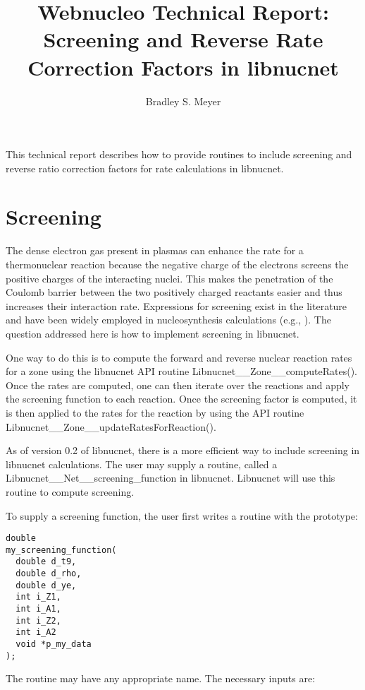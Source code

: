 \documentclass{article}    %
\title{Webnucleo Technical Report: Screening and Reverse Rate Correction
Factors in libnucnet}  %
\author{Bradley S. Meyer}
\begin{document}

\maketitle                 %


This technical report describes how to provide routines to include
screening and reverse ratio correction factors for rate calculations
in libnucnet.

\section{Screening}

The dense electron gas present in plasmas can enhance the rate for a
thermonuclear reaction because the negative charge of the electrons screens
the positive charges of the interacting nuclei.  This makes the penetration
of the Coulomb barrier between the two positively charged reactants easier
and thus increases their interaction rate.
Expressions for screening exist in the literature and have been widely
employed in nucleosynthesis calculations (e.g., \cite{1982ApJ...258..696W}).
The question addressed here is how to implement screening in libnucnet.

One way to do this is to compute the forward and reverse nuclear reaction
rates for a zone using the libnucnet API routine
Libnucnet\_\_Zone\_\_computeRates().
Once the rates are computed, one can
then iterate over the reactions and apply the screening function to each
reaction.  Once the screening factor is computed, it is then applied to
the rates for the reaction by using the API routine
Libnucnet\_\_Zone\_\_updateRatesForReaction().

As of version 0.2 of libnucnet, there is a more efficient way to include
screening in libnucnet calculations.  The user may supply a routine,
called a Libnucnet\_\_Net\_\_screening\_function in libnucnet.  Libnucnet
will use this routine to compute screening.

To supply a screening function, the user first writes a routine with the
prototype:

\begin{verbatim}
double
my_screening_function(
  double d_t9,
  double d_rho,
  double d_ye,
  int i_Z1,
  int i_A1,
  int i_Z2,
  int i_A2
  void *p_my_data
);
\end{verbatim}

The routine may have any appropriate name.  The necessary inputs are:
\end{document}
